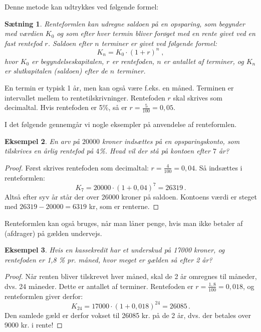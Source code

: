\documentclass[12pt,oneside,a4paper]{article}
\newtheorem{thm}{Sætning}[section]
\newtheorem{eks}[thm]{Eksempel}
\begin{document}
Denne metode kan udtrykkes ved følgende formel:
\begin{tcolorbox}
\begin{thm}
{\em Renteformlen} kan udregne saldoen på en opsparing, som begynder med
værdien $K_0$ og som efter hver {\em termin} bliver forøget med en rente
givet ved en fast rentefod $r$. Saldoen efter $n$ terminer er givet ved
følgende formel:
$$
K_n = K_0 \cdot (1+r)^n \;,
$$
hvor $K_0$ er {\em begyndelseskapitalen}, $r$ er rentefoden, $n$ er antallet af
terminer, og $K_n$ er {\em slutkapitalen} (saldoen) efter de $n$ terminer.
\end{thm}
\end{tcolorbox}
En termin er typisk 1 år, men kan også være f.eks. en måned. Terminen er
intervallet mellem to rentetilskrivninger.  Rentefoden $r$ skal skrives som
decimaltal.  Hvis rentefoden er 5\%, så er $r=\frac{5}{100}=0,05$.

I det følgende gennemgår vi nogle eksempler på anvendelse af renteformlen.
\begin{tcolorbox}
\begin{eks}
En arv på $20000$ kroner indsættes på en opsparingskonto, som tilskrives en
årlig rentefod på $4$\%. Hvad vil der stå på kontoen efter $7$ år?
\end{eks}
\begin{proof}
Først skrives rentefoden som decimaltal: $r=\frac{4}{100} = 0,04$. Så
indsættes i renteformlen:
\[ 
K_7 = 20000 \cdot (1 + 0,04)^7 = 26319\,.
\]
Altså efter syv år står der over 26000 kroner på saldoen.
Kontoens værdi er steget med $26319 - 20000 = 6319$ kr, som er renterne.
\end{proof}
\end{tcolorbox}

Renteformlen kan også bruges, når man låner penge, hvis man ikke betaler af
(afdrager) på gælden undervejs.
\begin{tcolorbox}
\begin{eks}
Hvis en kassekredit har et underskud på 17000 kroner, og rentefoden er 1,8 \%
pr. måned, hvor meget er gælden så efter 2 år?
\end{eks}
\begin{proof}
Når renten bliver tilskrevet hver måned, skal de 2 år omregnes til
måneder, dvs. 24 måneder. Dette er antallet af terminer. Rentefoden er $r =
\frac{1,8}{100} = 0,018$, og renteformlen giver derfor:
\[
K_{24} = 17000 \cdot (1 + 0,018)^{24} = 26085 \,.
\]
Den samlede gæld er derfor vokset til 26085 kr. på de 2 år, dvs.  der betales
over 9000 kr. i rente!
\end{proof}
\end{tcolorbox}
\end{document}
